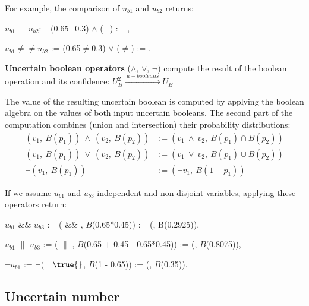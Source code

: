 For example, the comparison of $u_{b1}$ and $u_{b2}$ returns:
\begin{itemize*}
	\item[] $u_{b1}$==$u_{b2}$:= (0.65=0.3) $\land$ (\true{}=\true{}) := \false{},
	\item[] $u_{b1}$$\ne\ne$$u_{b2}$ := (0.65$\ne$0.3) $\lor$ (\true{}$\ne$\true{}) := \true{}.
\end{itemize*}

\begin{operator}
	\label{op:boolean}
	\textbf{Uncertain boolean operators} ($\land$, $\lor$, $\lnot$) compute the result of the boolean operation and its confidence: $U_B^2 \xrightarrow{~u-booleans~} U_B$
\end{operator}

The value of the resulting uncertain boolean is computed by applying the boolean algebra on the values of both input uncertain booleans.
The second part of the computation combines (union and intersection) their probability distributions:
\begin{align*}
	(v_1,~B(p_1))~\land~(v_2,~B(p_2)) &:= (v_1~\land~v_2,~B(p_1) \cap B(p_2))\\
	(v_1,~B(p_1))~\lor~(v_2,~B(p_2)) &:= (v_1~\lor~v_2,~B(p_1) \cup B(p_2))\\
	\lnot(v_1,~B(p_1)) &:= (\lnot v_1,~B(1-p_1))
\end{align*}

If we assume $u_{b1}$ and $u_{b3}$ independent and non-disjoint variables, applying these operators return:
\begin{itemize*}
	\item[] $u_{b1}$ $\&\&$ $u_{b3}$ := (\true{} $\&\&$ \false{}, $B$(0.65*0.45)) := (\false{}, B(0.2925)),
	\item[] $u_{b1}$ $\|$ $u_{b3}$ := (\true{} $\|$ \true{}, $B$(0.65 + 0.45 - 0.65*0.45)) := (\true{}, $B$(0.8075)),
	\item[] $\lnot u_{b1}$ := $\lnot ($ $\lnot \true{}$, $B$(1 - 0.65)) := (\false{}, $B$(0.35)).
\end{itemize*}

\subsection{Uncertain number}
